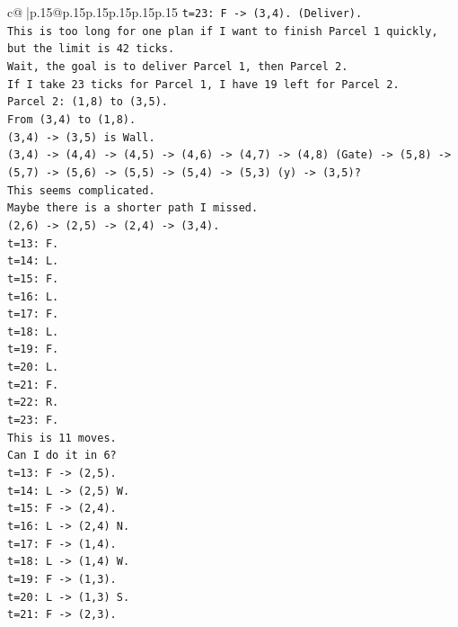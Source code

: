 \documentclass{article}
\begin{document}
{\begin{supertabular}{c@{$\;$}|p{.15\linewidth}@{}p{.15\linewidth}p{.15\linewidth}p{.15\linewidth}p{.15\linewidth}p{.15\linewidth}}
{{{\texttt{t=23: F {-}> (3,4). (Deliver).} \\
\texttt{This is too long for one plan if I want to finish Parcel 1 quickly, but the limit is 42 ticks.} \\
\texttt{Wait, the goal is to deliver Parcel 1, then Parcel 2.} \\
\texttt{If I take 23 ticks for Parcel 1, I have 19 left for Parcel 2.} \\
\texttt{Parcel 2: (1,8) to (3,5).} \\
\texttt{From (3,4) to (1,8).} \\
\texttt{(3,4) {-}> (3,5) is Wall.} \\
\texttt{(3,4) {-}> (4,4) {-}> (4,5) {-}> (4,6) {-}> (4,7) {-}> (4,8) (Gate) {-}> (5,8) {-}> (5,7) {-}> (5,6) {-}> (5,5) {-}> (5,4) {-}> (5,3) (y) {-}> (3,5)?} \\
\texttt{This seems complicated.} \\
\texttt{Maybe there is a shorter path I missed.} \\
\texttt{(2,6) {-}> (2,5) {-}> (2,4) {-}> (3,4).} \\
\texttt{t=13: F.} \\
\texttt{t=14: L.} \\
\texttt{t=15: F.} \\
\texttt{t=16: L.} \\
\texttt{t=17: F.} \\
\texttt{t=18: L.} \\
\texttt{t=19: F.} \\
\texttt{t=20: L.} \\
\texttt{t=21: F.} \\
\texttt{t=22: R.} \\
\texttt{t=23: F.} \\
\texttt{This is 11 moves.} \\
\texttt{Can I do it in 6?} \\
\texttt{t=13: F {-}> (2,5).} \\
\texttt{t=14: L {-}> (2,5) W.} \\
\texttt{t=15: F {-}> (2,4).} \\
\texttt{t=16: L {-}> (2,4) N.} \\
\texttt{t=17: F {-}> (1,4).} \\
\texttt{t=18: L {-}> (1,4) W.} \\
\texttt{t=19: F {-}> (1,3).} \\
\texttt{t=20: L {-}> (1,3) S.} \\
\texttt{t=21: F {-}> (2,3).} \\
}}}
\end{supertabular}}
\end{document}
